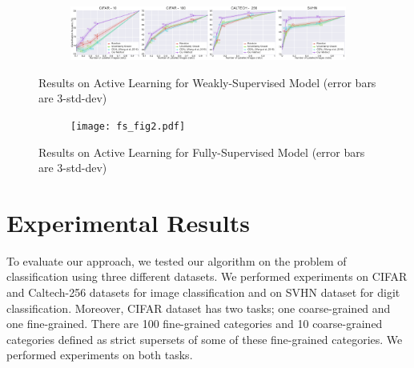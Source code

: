 \documentclass{article}
\begin{document}
\begin{figure}[ht]
    \centering
    \begin{subfigure}[b]{\textwidth}
        \includegraphics[width=\textwidth]{ws_fig2.pdf}
    \end{subfigure}
    \vspace{-5mm}
    \caption{Results on Active Learning for Weakly-Supervised Model (error bars are 3-std-dev)}\label{fig:ressemi}
        \vspace{-3mm}
    \label{fig:resns}
   \vspace{5mm}
    \begin{subfigure}[b]{\textwidth}
        \texttt{[image: fs\_fig2.pdf]}
    \end{subfigure}
        \vspace{-5mm}
    \caption{Results on Active Learning for Fully-Supervised Model (error bars are 3-std-dev)}\label{fig:resnosemi}
        \vspace{-5mm}
    \label{fig:ress}
\end{figure}

\section{Experimental Results}
\label{sec:exp}

To evaluate our approach, we tested our algorithm on the problem of classification using three different datasets. We performed experiments on CIFAR\cite{cifar} and Caltech-256\cite{caltech256} datasets for image classification and on SVHN\cite{svhn} dataset for digit classification. Moreover, CIFAR\cite{cifar} dataset has two tasks; one coarse-grained and one fine-grained. There are 100 fine-grained categories and 10 coarse-grained categories defined as strict supersets of some of these fine-grained categories. We performed experiments on both tasks.
\end{document}
